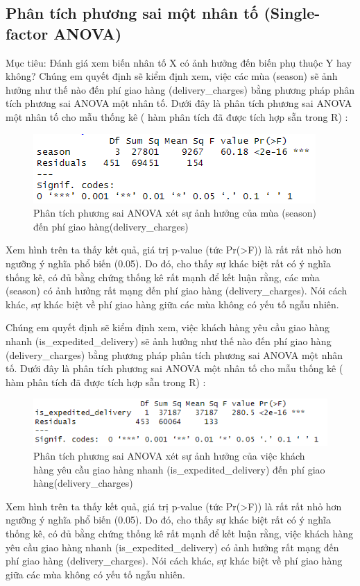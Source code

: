 \subsection{Phân tích phương sai một nhân tố (Single-factor ANOVA)}
Mục tiêu: Đánh giá xem biến nhân tố X có ảnh hưởng đến biến phụ thuộc Y hay không?
    Chúng em quyết định sẽ kiểm định xem, việc các mùa (season) sẽ ảnh hưởng như thế nào đến phí giao hàng (delivery\_charges) bằng
phương pháp phân tích phương sai ANOVA một nhân tố. Dưới đây là phân tích phương sai ANOVA một nhân tố cho mẫu thống kê ( hàm phân tích đã được tích hợp sẵn trong R) :

\begin{figure}[!htbp]
    \centering
    \includegraphics[width=0.7\linewidth]{graphics/5.3.1.png}
    \caption{Phân tích phương sai ANOVA xét sự ảnh hưởng của mùa (season) đến phí giao hàng(delivery\_charges)}
\end{figure}

    Xem hình trên ta thấy kết quả, giá trị p-value (tức Pr(>F)) là rất rất nhỏ hơn ngưỡng ý nghĩa phổ biến (0.05). Do đó, cho thấy sự
khác biệt rất có ý nghĩa thống kê, có đủ bằng chứng thống kê rất mạnh để kết luận rằng, các mùa (season) có ảnh hưởng rất mạng đến phí giao hàng (delivery\_charges). Nói cách khác, sự khác biệt về phí giao hàng giữa các mùa không có yếu tố ngẫu nhiên.


    Chúng em quyết định sẽ kiểm định xem, việc khách hàng yêu cầu giao hàng nhanh (is\_expedited\_delivery) sẽ ảnh hưởng như thế nào đến
phí giao hàng (delivery\_charges) bằng phương pháp phân tích phương sai ANOVA một nhân tố. Dưới đây là phân tích phương sai ANOVA một nhân tố cho mẫu thống kê ( hàm phân tích đã được tích hợp sẵn trong R) :
\begin{figure}[!htbp]
    \centering
    \includegraphics[width=0.7\linewidth]{graphics/5.3.2.png}
    \caption{Phân tích phương sai ANOVA xét sự ảnh hưởng của việc khách hàng yêu cầu giao hàng nhanh (is\_expedited\_delivery) đến phí giao hàng(delivery\_charges)}
\end{figure}

    Xem hình trên ta thấy kết quả, giá trị p-value (tức Pr(>F)) là rất rất nhỏ hơn ngưỡng ý nghĩa phổ biến (0.05). Do đó, cho thấy sự
khác biệt rất có ý nghĩa thống kê, có đủ bằng chứng thống kê rất mạnh để kết luận rằng, việc khách hàng yêu cầu giao hàng nhanh (is\_expedited\_delivery) có ảnh hưởng rất mạng đến phí giao hàng (delivery\_charges). Nói cách khác, sự khác biệt về phí giao hàng giữa các mùa không có yếu tố ngẫu nhiên.

